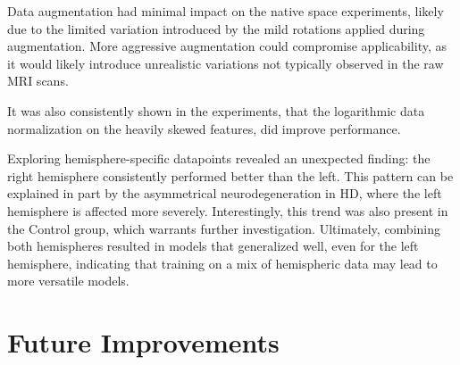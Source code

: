 Data augmentation had minimal impact on the native space experiments, likely due to the limited variation introduced by the mild rotations applied during augmentation. More aggressive augmentation could compromise applicability, as it would likely introduce unrealistic variations not typically observed in the raw \ac{MRI} scans.\par
It was also consistently shown in the experiments, that the logarithmic data normalization on the heavily skewed features, did improve performance.\par
Exploring hemisphere-specific datapoints revealed an unexpected finding: the right hemisphere consistently performed better than the left. This pattern can be explained in part by the asymmetrical neurodegeneration in \ac{HD}, where the left hemisphere is affected more severely. Interestingly, this trend was also present in the Control group, which warrants further investigation. Ultimately, combining both hemispheres resulted in models that generalized well, even for the left hemisphere, indicating that training on a mix of hemispheric data may lead to more versatile models.\par

\section{Future Improvements}
\label{sec:improve}

